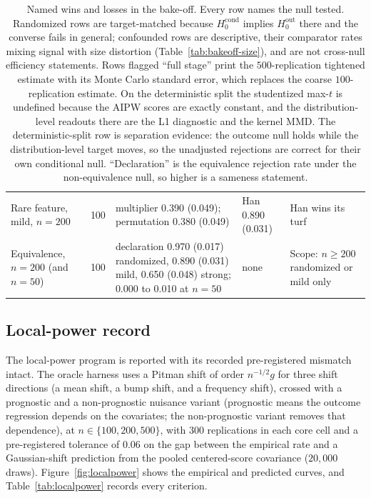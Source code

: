 \begin{table}[H]
\begin{tabular}{p{3.6cm}p{1.0cm}p{3.9cm}p{3.6cm}p{2.6cm}}
Rare feature, mild, $n=200$ & 100 & multiplier 0.390 (0.049); permutation 0.380 (0.049) & Han 0.890 (0.031) & Han wins its turf \\
Equivalence, $n=200$ (and $n=50$) & 100 & declaration 0.970 (0.017) randomized, 0.890 (0.031) mild, 0.650 (0.048) strong; 0.000 to 0.010 at $n=50$ & none & Scope: $n \ge 200$ randomized or mild only \\
\bottomrule
\end{tabular}
\caption{Named wins and losses in the bake-off. Every row names the null tested. Randomized rows are target-matched because $H_0^{\mathrm{cond}}$ implies $H_0^{\mathrm{out}}$ there and the converse fails in general; confounded rows are descriptive, their comparator rates mixing signal with size distortion (Table~\ref{tab:bakeoff-size}), and are not cross-null efficiency statements. Rows flagged ``full stage'' print the $500$-replication tightened estimate with its Monte Carlo standard error, which replaces the coarse $100$-replication estimate. On the deterministic split the studentized max-$t$ is undefined because the AIPW scores are exactly constant, and the distribution-level readouts there are the L1 diagnostic and the kernel MMD. The deterministic-split row is separation evidence: the outcome null holds while the distribution-level target moves, so the unadjusted rejections are correct for their own conditional null. ``Declaration'' is the equivalence rejection rate under the non-equivalence null, so higher is a sameness statement.}
\label{tab:winslosses}
\end{table}

\subsection{Local-power record}
\label{sec:exp:localpower}

The local-power program is reported with its recorded pre-registered mismatch intact. The oracle harness uses a Pitman shift of order $n^{-1/2}g$ for three shift directions (a mean shift, a bump shift, and a frequency shift), crossed with a prognostic and a non-prognostic nuisance variant (prognostic means the outcome regression depends on the covariates; the non-prognostic variant removes that dependence), at $n \in \{100,200,500\}$, with $300$ replications in each core cell and a pre-registered tolerance of $0.06$ on the gap between the empirical rate and a Gaussian-shift prediction from the pooled centered-score covariance ($20{,}000$ draws). Figure~\ref{fig:localpower} shows the empirical and predicted curves, and Table~\ref{tab:localpower} records every criterion.

